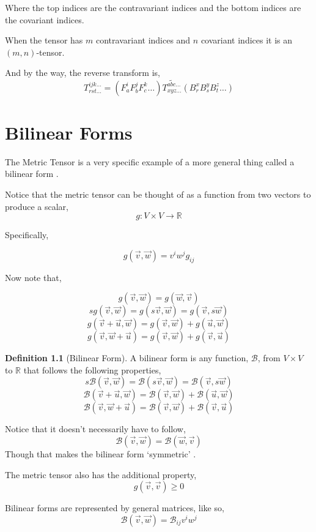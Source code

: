 \documentclass[12pt]{book}
\theoremstyle{plain}
\theoremstyle{definition}
\newtheorem{definition}{Definition}[chapter]
\theoremstyle{ppart}
\theoremstyle{case}
\theoremstyle{solution}
\begin{document}
Where the top indices are the contravariant indices
and the bottom indices are the covariant indices.

When the tensor has $m$ contravariant indices and $n$ covariant indices
it is an $(m,n)$-tensor.

And by the way, the reverse transform is,
\[
  T^{ijk\dots}_{rst\dots}
  =
  (F^i_a F^j_b F^k_c \dots) 
  \widetilde{T^{abc\dots}_{xyz\dots}}
  (B^x_r B^y_s B^z_t \dots) 
\]

\chapter{Bilinear Forms}

The Metric Tensor is a very specific example of a more general thing called a bilinear form \cite{youtube:tensor9}.

Notice that the metric tensor can be thought of as a function from two vectors to produce a scalar,
\[ g: V \times V \to \mathbb{R} \]

Specifically,

\[ g(\vec{v}, \vec{w}) = v^i w^j g_{ij} \]

Now note that,

\[ g(\vec{v}, \vec{w}) = g(\vec{w}, \vec{v}) \]
\[ s g(\vec{v}, \vec{w}) = g(s \vec{v}, \vec{w}) =  g(\vec{v}, s \vec{w}) \]
\[ g(\vec{v}+\vec{u}, \vec{w}) = g(\vec{v}, \vec{w}) + g(\vec{u}, \vec{w})\]
\[ g(\vec{v}, \vec{w}+\vec{u}) = g(\vec{v}, \vec{w}) + g(\vec{v}, \vec{u}) \]

\begin{definition}[Bilinear Form]
A bilinear form is any function, $\mathcal{B}$, from $V \times V$ to $\mathbb{R}$ that follows
the following properties,
\[ s \mathcal{B}(\vec{v}, \vec{w}) = \mathcal{B}(s \vec{v}, \vec{w}) =  \mathcal{B}(\vec{v}, s \vec{w}) \]
\[ \mathcal{B}(\vec{v}+\vec{u}, \vec{w}) = \mathcal{B}(\vec{v}, \vec{w}) + \mathcal{B}(\vec{u}, \vec{w})\]
\[ \mathcal{B}(\vec{v}, \vec{w}+\vec{u}) = \mathcal{B}(\vec{v}, \vec{w}) + \mathcal{B}(\vec{v}, \vec{u}) \]

Notice that it doesn't necessarily have to follow,
\[ \mathcal{B}(\vec{v}, \vec{w}) = \mathcal{B}(\vec{w}, \vec{v}) \]
Though that makes the bilinear form `symmetric' \cite{wiki:bilinear}.
\end{definition}

The metric tensor also has the additional property,
\[ g(\vec{v}, \vec{v}) \ge 0 \]

Bilinear forms are represented by general matrices, like so,
\[ \mathcal{B}(\vec{v}, \vec{w}) = \mathcal{B}_{ij} v^i w^j \]
\end{document}
